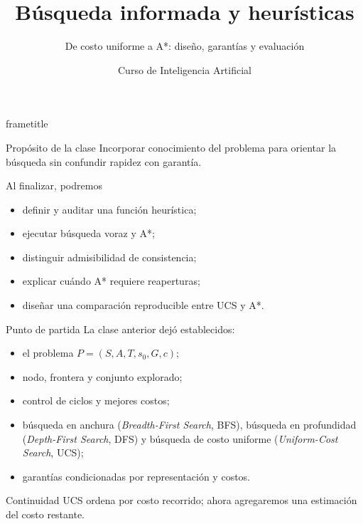 \documentclass[aspectratio=169,11pt]{beamer}
\title[IA · Clase 3]{Búsqueda informada y heurísticas}
\subtitle{De costo uniforme a A*: diseño, garantías y evaluación}
\author{Curso de Inteligencia Artificial}
\institute{Semana 3 · Clase 3}
\date{}
\begin{document}
\begin{frame}[plain]
  \begin{beamercolorbox}[wd=\paperwidth,ht=\paperheight,sep=2em]{frametitle}
    \vfill {\Huge\bfseries\inserttitle\par}\vspace{.5em}
    {\color{UAPGold}\Large\insertsubtitle\par}\vspace{2em}
    {\color{white}\large\insertauthor\par\insertinstitute\par}\vfill
  \end{beamercolorbox}
\end{frame}

\begin{frame}{Propósito de la clase}
  Incorporar conocimiento del problema para orientar la búsqueda sin confundir rapidez con garantía.
  \begin{block}{Al finalizar, podremos}
    \begin{itemize}
      \item definir y auditar una función heurística;
      \item ejecutar búsqueda voraz y A*;
      \item distinguir admisibilidad de consistencia;
      \item explicar cuándo A* requiere reaperturas;
      \item diseñar una comparación reproducible entre UCS y A*.
    \end{itemize}
  \end{block}
\end{frame}

\begin{frame}{Punto de partida}
  La clase anterior dejó establecidos:
  \begin{itemize}
    \item el problema $P=(S,A,T,s_0,G,c)$;
    \item nodo, frontera y conjunto explorado;
    \item control de ciclos y mejores costos;
    \item búsqueda en anchura (\emph{Breadth-First Search}, BFS), búsqueda en profundidad (\emph{Depth-First Search}, DFS) y búsqueda de costo uniforme (\emph{Uniform-Cost Search}, UCS);
    \item garantías condicionadas por representación y costos.
  \end{itemize}
  \begin{block}{Continuidad}
    UCS ordena por costo recorrido; ahora agregaremos una estimación del costo restante.
  \end{block}
\end{frame}
\end{document}
